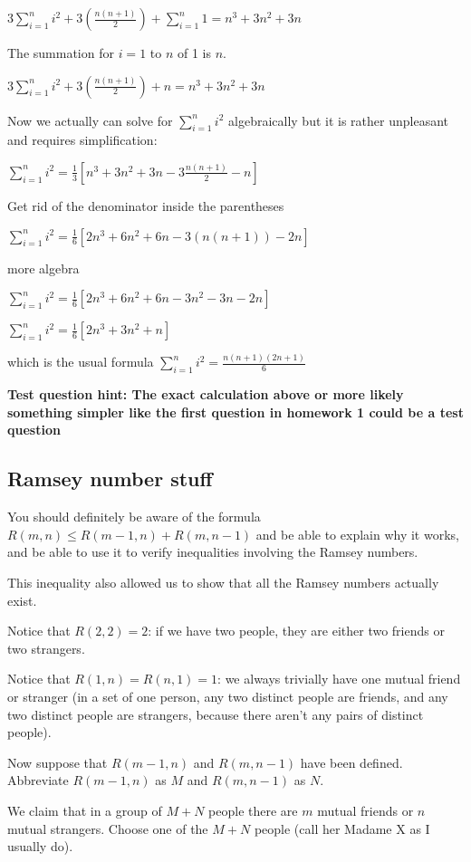 \documentclass[12pt]{article}
\begin{document}
$3\sum_{i=1}^ni^2 + 3(\frac{n(n+1)}2) + \sum_{i=1}^n 1 = n^3+3n^2+3n$

The summation for $i=1$ to $n$ of 1 is $n$.

$3\sum_{i=1}^ni^2 + 3(\frac{n(n+1)}2) + n = n^3+3n^2+3n$

Now we actually can solve for $\sum_{i=1}^ni^2$ algebraically but it is rather unpleasant and requires simplification:

$\sum_{i=1}^n i^2 = \frac13[n^3+3n^2+3n -3\frac{n(n+1)}2-n]$

Get rid of the denominator inside the parentheses

$\sum_{i=1}^n i^2 = \frac16[2n^3+6n^2+6n -3(n(n+1))-2n]$

more algebra

$\sum_{i=1}^n i^2 = \frac16[2n^3+6n^2+6n-3n^2-3n-2n]$

$\sum_{i=1}^n i^2 = \frac16[2n^3+3n^2+n]$

which is the usual formula $\sum_{i=1}^n i^2 = \frac{n(n+1)(2n+1)}6$

{\bf Test question hint:  The exact calculation above or more likely something simpler like the first question in homework 1 could be a test question}

\subsection{Ramsey number stuff}

You should definitely be aware of the formula $R(m,n) \leq R(m-1,n)+R(m,n-1)$ and be able to explain why it works, and be able to use it to verify inequalities involving the Ramsey numbers.

This inequality also allowed us to show that all the Ramsey numbers actually exist.

Notice that $R(2,2)= 2$:  if we have two people, they are either two friends or two strangers.

Notice that $R(1,n)=R(n,1)=1$:  we always trivially have one mutual friend or stranger (in a set of one person, any two distinct people are friends, and any two distinct people are strangers, because there aren't any pairs of distinct people).

Now suppose that $R(m-1,n)$ and $R(m,n-1)$ have been defined.  Abbreviate $R(m-1,n)$ as $M$ and $R(m,n-1)$ as $N$.

We claim that in a group of $M+N$ people there are $m$ mutual friends or $n$ mutual strangers.  Choose one of the $M+N$ people (call her Madame X as I usually do). 
\end{document}
